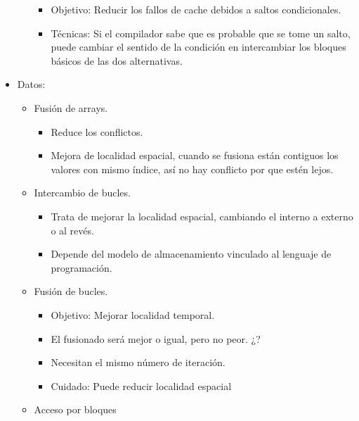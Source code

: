 \documentclass[12pt, twoside, openright]{report} %
\begin{document}
\begin{itemize}
\begin{itemize}
        \begin{itemize}
        
        \item
          Objetivo: Reducir los fallos de cache debidos a saltos
          condicionales.
        \item
          Técnicas: Si el compilador sabe que es probable que se tome un
          salto, puede cambiar el sentido de la condición en
          intercambiar los bloques básicos de las dos alternativas.
        \end{itemize}
      \end{itemize}
    \item
      Datos:

      \begin{itemize}
      \item
        Fusión de arrays.

        \begin{itemize}
        
        \item
          Reduce los conflictos.
        \item
          Mejora de localidad espacial, cuando se fusiona están
          contiguos los valores con mismo índice, así no hay conflicto
          por que estén lejos.
        \end{itemize}
      \item
        Intercambio de bucles.

        \begin{itemize}
        
        \item
          Trata de mejorar la localidad espacial, cambiando el interno a
          externo o al revés.
        \item
          Depende del modelo de almacenamiento vinculado al lenguaje de
          programación.
        \end{itemize}
      \item
        Fusión de bucles.

        \begin{itemize}
        
        \item
          Objetivo: Mejorar localidad temporal.
        \item
          El fusionado será mejor o igual, pero no peor. ¿?
        \item
          Necesitan el mismo número de iteración.
        \item
          Cuidado: Puede reducir localidad espacial
        \end{itemize}
      \item
        Acceso por bloques


\end{itemize}
\end{itemize}
\end{document}
